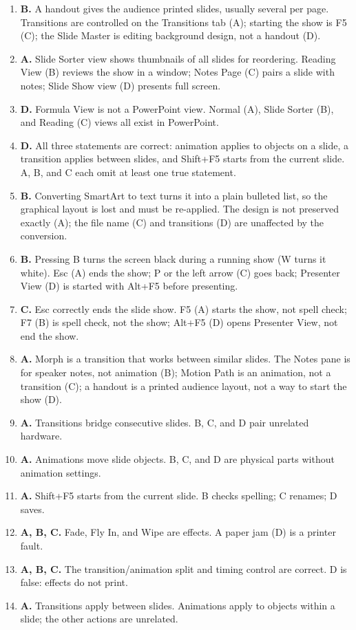 \begin{enumerate}[label=\textbf{Q\arabic*.}, leftmargin=*]
  Animations tab (C); theme colours are changed from the Design tab (D).
\item \textbf{B.} A handout gives the audience printed slides, usually several
  per page. Transitions are controlled on the Transitions tab (A); starting the
  show is F5 (C); the Slide Master is editing background design, not a handout
  (D).
\item \textbf{A.} Slide Sorter view shows thumbnails of all slides for
  reordering. Reading View (B) reviews the show in a window; Notes Page (C)
  pairs a slide with notes; Slide Show view (D) presents full screen.
\item \textbf{D.} Formula View is not a PowerPoint view. Normal (A), Slide
  Sorter (B), and Reading (C) views all exist in PowerPoint.
\item \textbf{D.} All three statements are correct: animation applies to objects
  on a slide, a transition applies between slides, and Shift+F5 starts from the
  current slide. A, B, and C each omit at least one true statement.
\item \textbf{B.} Converting SmartArt to text turns it into a plain bulleted
  list, so the graphical layout is lost and must be re-applied. The design is
  not preserved exactly (A); the file name (C) and transitions (D) are
  unaffected by the conversion.
\item \textbf{B.} Pressing B turns the screen black during a running show
  (W turns it white). Esc (A) ends the show; P or the left arrow (C) goes
  back; Presenter View (D) is started with Alt+F5 before presenting.
\item \textbf{C.} Esc correctly ends the slide show. F5 (A) starts the show,
  not spell check; F7 (B) is spell check, not the show; Alt+F5 (D) opens
  Presenter View, not end the show.
\item \textbf{A.} Morph is a transition that works between similar slides. The
  Notes pane is for speaker notes, not animation (B); Motion Path is an
  animation, not a transition (C); a handout is a printed audience layout, not
  a way to start the show (D).

\item \textbf{A.} Transitions bridge consecutive slides. B, C, and D pair unrelated hardware.
\item \textbf{A.} Animations move slide objects. B, C, and D are physical parts without animation settings.
\item \textbf{A.} Shift+F5 starts from the current slide. B checks spelling; C renames; D saves.
\item \textbf{A, B, C.} Fade, Fly In, and Wipe are effects. A paper jam (D) is a printer fault.
\item \textbf{A, B, C.} The transition/animation split and timing control are correct. D is false: effects do not print.
\item \textbf{A.} Transitions apply between slides. Animations apply to objects within a slide; the other actions are unrelated.


\end{enumerate}
